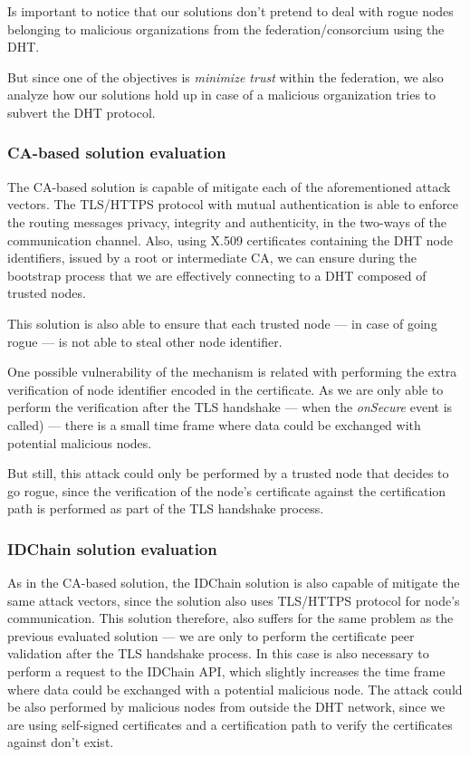 Is important to notice that our solutions don't pretend to deal with rogue nodes belonging to malicious organizations from the federation/consorcium using the DHT.

But since one of the objectives is \textit{minimize trust} within the federation, we also analyze how our solutions hold up in case of a malicious organization tries to subvert the DHT protocol.

\subsubsection{CA-based solution evaluation}

The CA-based solution is capable of mitigate each of the aforementioned attack vectors.
The TLS/HTTPS protocol with mutual authentication is able to enforce the routing messages privacy, integrity and authenticity, in the two-ways of the communication channel.
Also, using X.509 certificates containing the DHT node identifiers, issued by a root or intermediate CA, we can ensure during the bootstrap process that we are effectively connecting to a DHT composed of trusted nodes.

This solution is also able to ensure that each trusted node — in case of going rogue — is not able to steal other node identifier.

One possible vulnerability of the mechanism is related with performing the extra verification of node identifier encoded in the certificate.
As we are only able to perform the verification after the TLS handshake — when the \textit{onSecure} event is called) — there is a small time frame where data could be exchanged with potential malicious nodes.

But still, this attack could only be performed by a trusted node that decides to go rogue, since the verification of the node's certificate against the certification path is performed as part of the TLS handshake process.

\subsubsection{IDChain solution evaluation}

As in the CA-based solution, the IDChain solution is also capable of mitigate the same attack vectors, since the solution also uses TLS/HTTPS protocol for node's communication.
This solution therefore, also suffers for the same problem as the previous evaluated solution — we are only to perform the certificate peer validation after the TLS handshake process.
In this case is also necessary to perform a request to the IDChain API, which slightly increases the time frame where data could be exchanged with a potential malicious node.
The attack could be also performed by malicious nodes from outside the DHT network, since we are using self-signed certificates and a certification path to verify the certificates against don't exist.

